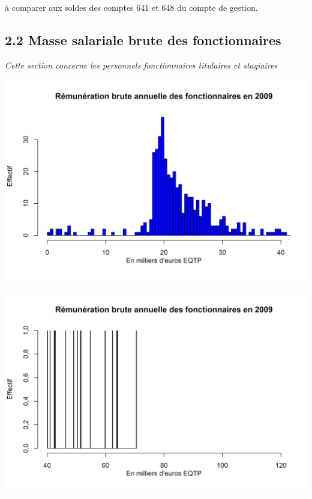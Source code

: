à comparer aux soldes des comptes 641 et 648 du compte de gestion.

\hypertarget{masse-salariale-brute-des-fonctionnaires}{%
\subsection{2.2 Masse salariale brute des
fonctionnaires}\label{masse-salariale-brute-des-fonctionnaires}}

\emph{Cette section concerne les personnels fonctionnaires titulaires et
stagiaires}

\includegraphics{altair_files/figure-latex/unnamed-chunk-43-1.png}

\includegraphics{altair_files/figure-latex/unnamed-chunk-43-2.png}

